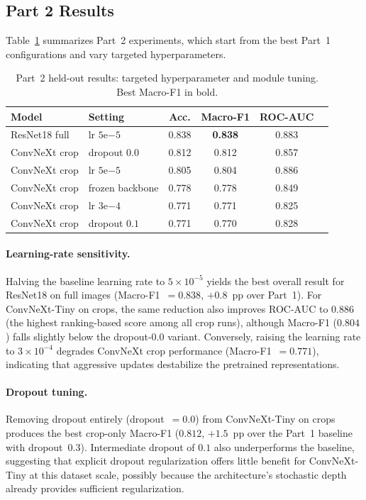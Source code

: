 \documentclass[sigconf]{acmart}
\begin{document}
\subsection{Part 2 Results}

Table~\ref{tab:part2} summarizes Part~2 experiments, which start from the
best Part~1 configurations and vary targeted hyperparameters.

\begin{table}[t]
  \centering
  \caption{Part~2 held-out results: targeted hyperparameter and module
  tuning. Best Macro-F1 in bold.}
  \label{tab:part2}
  \small
  \begin{tabular}{llcccc}
    \toprule
    Model & Setting & Acc. & Macro-F1 & ROC-AUC \\
    \midrule
    ResNet18 full & lr $5\mathrm{e}{-5}$ & 0.838 & \textbf{0.838} & 0.883 \\
    ConvNeXt crop & dropout $0.0$ & 0.812 & 0.812 & 0.857 \\
    ConvNeXt crop & lr $5\mathrm{e}{-5}$ & 0.805 & 0.804 & 0.886 \\
    ConvNeXt crop & frozen backbone & 0.778 & 0.778 & 0.849 \\
    ConvNeXt crop & lr $3\mathrm{e}{-4}$ & 0.771 & 0.771 & 0.825 \\
    ConvNeXt crop & dropout $0.1$ & 0.771 & 0.770 & 0.828 \\
    \bottomrule
  \end{tabular}
\end{table}

\paragraph{Learning-rate sensitivity.}
Halving the baseline learning rate to $5\times10^{-5}$ yields the best overall
result for ResNet18 on full images (Macro-F1~$=0.838$, $+0.8$~pp over
Part~1). For ConvNeXt-Tiny on crops, the same reduction also improves
ROC-AUC to $0.886$ (the highest ranking-based score among all crop runs),
although Macro-F1 ($0.804$) falls slightly below the dropout-$0.0$ variant.
Conversely, raising the learning rate to $3\times10^{-4}$ degrades ConvNeXt
crop performance (Macro-F1~$=0.771$), indicating that aggressive updates
destabilize the pretrained representations.

\paragraph{Dropout tuning.}
Removing dropout entirely (dropout~$=0.0$) from ConvNeXt-Tiny on crops
produces the best crop-only Macro-F1 ($0.812$, $+1.5$~pp over the Part~1
baseline with dropout~$0.3$). Intermediate dropout of $0.1$ also
underperforms the baseline, suggesting that explicit dropout regularization
offers little benefit for ConvNeXt-Tiny at this dataset scale, possibly
because the architecture's stochastic depth already provides sufficient
regularization.
\end{document}
